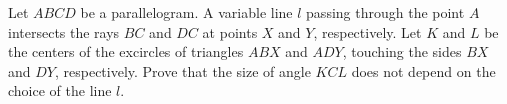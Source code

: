 Let $ABCD$ be a parallelogram. A variable line $l$ passing through the point $A$ intersects the rays $BC$ and $DC$ at points $X$ and $Y$, respectively. Let $K$ and $L$ be the centers of the excircles of triangles $ABX$ and $ADY$, touching the sides $BX$ and $DY$, respectively. Prove that the size of angle $KCL$ does not depend on the choice of the line $l$.
